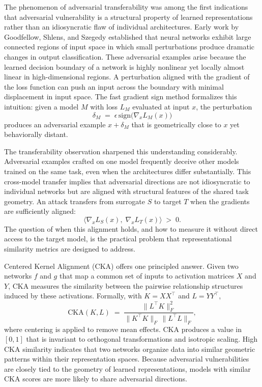 \documentclass[12pt,a4paper]{article}
\theoremstyle{plain}
\theoremstyle{definition}
\newcommand{\sign}{\mathrm{sign}}
\begin{document}
The phenomenon of adversarial transferability was among the first indications
that adversarial vulnerability is a structural property of learned
representations rather than an idiosyncratic flaw of individual architectures.
Early work by Goodfellow, Shlens, and Szegedy established that neural networks
exhibit large connected regions of input space in which small perturbations
produce dramatic changes in output classification. These adversarial examples
arise because the learned decision boundary of a network is highly nonlinear
yet locally almost linear in high-dimensional regions. A perturbation aligned
with the gradient of the loss function can push an input across the boundary
with minimal displacement in input space. The fast gradient sign method
formalizes this intuition: given a model $M$ with loss $L_M$ evaluated at
input $x$, the perturbation
\[
\delta_M \;=\; \epsilon\,\sign\!\bigl(\nabla_x L_M(x)\bigr)
\]
produces an adversarial example $x + \delta_M$ that is geometrically close to
$x$ yet behaviorally distant.

The transferability observation sharpened this understanding considerably.
Adversarial examples crafted on one model frequently deceive other models
trained on the same task, even when the architectures differ substantially.
This cross-model transfer implies that adversarial directions are not
idiosyncratic to individual networks but are aligned with structural features
of the shared task geometry. An attack transfers from surrogate $S$ to target
$T$ when the gradients are sufficiently aligned:
\[
\bigl\langle \nabla_x L_S(x),\; \nabla_x L_T(x) \bigr\rangle \;>\; 0.
\]
The question of when this alignment holds, and how to measure it without direct
access to the target model, is the practical problem that representational
similarity metrics are designed to address.

Centered Kernel Alignment (CKA) offers one principled answer. Given two
networks $f$ and $g$ that map a common set of inputs to activation matrices
$X$ and $Y$, CKA measures the similarity between the pairwise relationship
structures induced by these activations. Formally, with $K = XX^\top$ and
$L = YY^\top$,
\[
\mathrm{CKA}(K, L) \;=\; \frac{\|L^\top K\|_F^2}{\|K^\top K\|_F \,\|L^\top L\|_F},
\]
where centering is applied to remove mean effects. CKA produces a value in
$[0,1]$ that is invariant to orthogonal transformations and isotropic scaling.
High CKA similarity indicates that two networks organize data into similar
geometric patterns within their representation spaces. Because adversarial
vulnerabilities are closely tied to the geometry of learned representations,
models with similar CKA scores are more likely to share adversarial directions.
\end{document}
